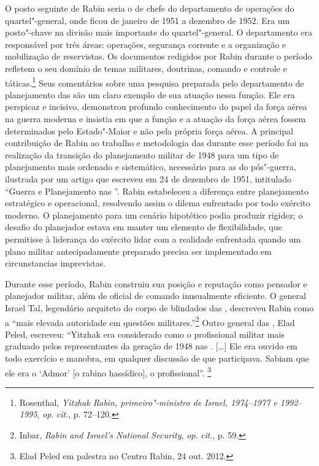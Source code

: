 O posto seguinte de Rabin seria o de chefe do departamento de operações
do quartel"-general, onde ficou de janeiro de 1951 a dezembro de 1952.
Era um posto"-chave na divisão mais importante do quartel"-general. O
departamento era responsável por três áreas: operações, segurança
corrente e a organização e mobilização de reservistas. Os documentos
redigidos por Rabin durante o período refletem o seu domínio de temas
militares, doutrinas, comando e controle e táticas.\footnote{Rosenthal, \emph{Yitzhak Rabin, primeiro"-ministro de Israel, 1974--1977 e 1992--1995}, \emph{op}. \emph{cit}., p. 72--120.} Seus
comentários sobre uma pesquisa preparada pelo departamento de
planejamento das  são um claro exemplo de sua atuação nessa função.
Ele era perspicaz e incisivo, demonstrou profundo conhecimento do
papel da força aérea na guerra moderna e insistia em que a função e a
atuação da força aérea fossem determinados pelo Estado"-Maior e não pela
própria força aérea. A principal contribuição de Rabin ao trabalho e
metodologia das  durante esse período foi na realização da transição
do planejamento militar de 1948 para um tipo de planejamento mais
ordenado e sistemático, necessário para as  do pós"-guerra, ilustrada
por um artigo que escreveu em 24 de dezembro de 1951, intitulado ``Guerra e
Planejamento nas ''. Rabin estabeleceu a diferença entre planejamento
estratégico e operacional, resolvendo assim o dilema enfrentado por todo
exército moderno. O planejamento para um cenário hipotético podia
produzir rigidez; o desafio do planejador estava em manter um elemento
de flexibilidade, que permitisse à liderança do exército lidar com a
realidade enfrentada quando um plano militar antecipadamente preparado
precisa ser implementado em circunstancias imprevistas.

Durante esse período, Rabin construiu sua posição e reputação como
pensador e planejador militar, além de oficial de comando inusualmente
eficiente. O general Israel Tal, legendário arquiteto do corpo de
blindados das , descreveu Rabin como a ``mais elevada autoridade em
questões militares.''\footnote{Inbar, \emph{Rabin and Israel's National Security}, \emph{op}. \emph{cit}., p. 59.} Outro general das , Elad Peled,
escreveu: ``Yitzhak era considerado como o profissional militar mais
graduado pelos representantes da geração de 1948 nas . {[}\ldots{}{]} Ele era
ouvido em todo exercício e manobra, em qualquer discussão de que
participava. Sabiam que ele era o `Admor' {[}o rabino hassídico{]}, o
profissional''. \footnote{Elad Peled em palestra no Centro Rabin, 24 out. 2012.}

